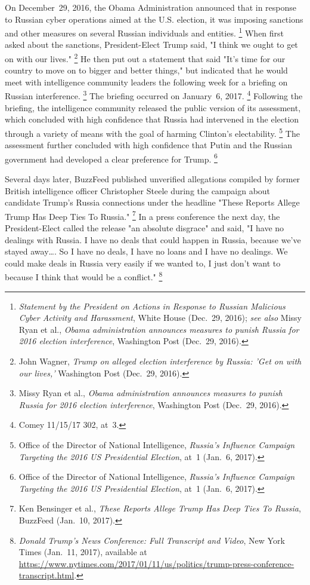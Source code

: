 On December~29, 2016, the Obama Administration announced that in response to Russian cyber operations aimed at the U.S. election, it was imposing sanctions and other measures on several Russian individuals and entities.%
\footnote{\textit{Statement by the President on Actions in Response to Russian Malicious Cyber Activity and Harassment}, White House (Dec.~29, 2016);
\textit{see also} Missy Ryan et al., \textit{Obama administration announces measures to punish Russia for 2016 election interference}, Washington Post (Dec.~29, 2016).
}
When first asked about the sanctions, President-Elect Trump said, "I think we ought to get on with our lives."%
\footnote{John Wagner, \textit{Trump on alleged election interference by Russia: 'Get on with our lives,'} Washington Post (Dec.~29, 2016).}
He then put out a statement that said "It's time for our country to move on to bigger and better things," but indicated that he would meet with intelligence community leaders the following week for a briefing on Russian interference.%
\footnote{Missy Ryan et al., \textit{Obama administration announces measures to punish Russia for 2016 election interference}, Washington Post (Dec.~29, 2016).}
The briefing occurred on January~6, 2017.%
\footnote{Comey 11/15/17 302, at~3.}
Following the briefing, the intelligence community released the public version of its assessment, which concluded with high confidence that Russia had intervened in the election through a variety of means with the goal of harming Clinton's electability.%
\footnote{Office of the Director of National Intelligence, \textit{Russia's Influence Campaign Targeting the 2016 US Presidential Election}, at~1 (Jan.~6, 2017).}
The assessment further concluded with high confidence that Putin and the Russian government had developed a clear preference for Trump.%
\footnote{Office of the Director of National Intelligence, \textit{Russia's Influence Campaign Targeting the 2016 US Presidential Election}, at~1 (Jan.~6, 2017).}

Several days later, BuzzFeed published unverified allegations compiled by former British intelligence officer Christopher Steele during the campaign about candidate Trump's Russia connections under the headline "These Reports Allege Trump Has Deep Ties To Russia."%
\footnote{Ken Bensinger et al., \textit{These Reports Allege Trump Has Deep Ties To Russia}, BuzzFeed (Jan.~10, 2017).}
In a press conference the next day, the President-Elect called the release "an absolute disgrace" and said, "I have no dealings with Russia.
I have no deals that could happen in Russia, because we've stayed away\dots.
So I have no deals, I have no loans and I have no dealings.
We could make deals in Russia very easily if we wanted to, I just don't want to because I think that would be a conflict."%
\footnote{\textit{Donald Trump's News Conference: Full Transcript and Video}, New York Times (Jan.~11, 2017), available at \url{https://www.nytimes.com/2017/01/11/us/politics/trump-press-conference-transcript.html}.}

